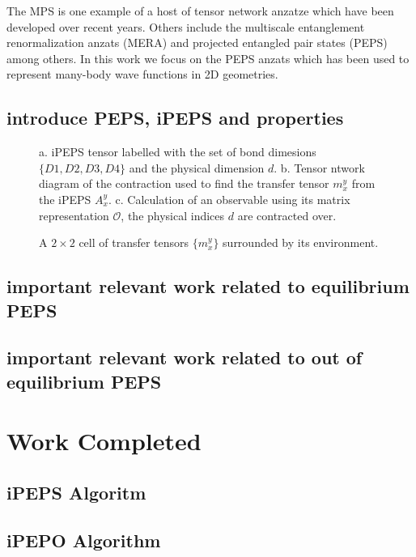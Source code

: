 \documentclass[10pt,twocolumn]{article}
\begin{document}
The MPS is one example of a host of tensor network anzatze which have been developed over recent years. Others include the multiscale entanglement renormalization anzats (MERA) and projected entangled pair states (PEPS) among others. In this work we focus on the PEPS anzats which has been used to represent many-body wave functions in 2D geometries.  

\subsection{introduce PEPS, iPEPS and properties}

\begin{figure}
    \centering
    
    \caption{a. iPEPS tensor labelled with the set of bond dimesions $\{D1,D2,D3,D4\}$ and the physical dimension $d$. b. Tensor ntwork diagram of the contraction used to find the transfer tensor $m_x^y$ from the iPEPS $A^y_x$. c. Calculation of an observable using its matrix representation $\mathcal{O}$, the physical indices $d$ are contracted over. }
    \label{fig:my_label}
\end{figure}
\begin{figure}
    \centering
    
    \caption{A $2 \times 2$  cell of transfer tensors $\{m^y_x\}$ surrounded by its environment. } 
    \label{fig:my_label}
\end{figure}
\subsection{important relevant work related to equilibrium PEPS}
\subsection{important relevant work related to out of equilibrium PEPS}



\section{Work Completed}
\subsection{iPEPS Algoritm}


\subsection{iPEPO Algorithm}
\end{document}
